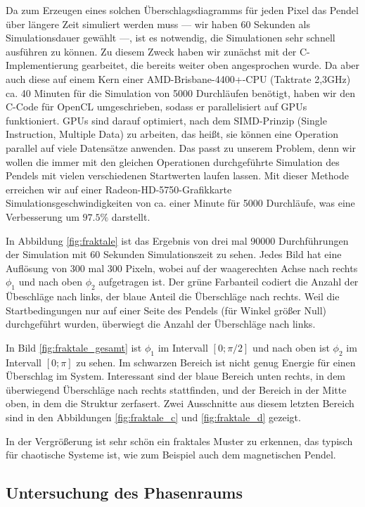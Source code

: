 Da zum Erzeugen eines solchen Überschlagsdiagramms für jeden Pixel das Pendel über längere Zeit simuliert werden muss --- wir haben 60 Sekunden
als Simulationsdauer gewählt ---, ist es notwendig, die Simulationen sehr schnell ausführen zu können. Zu diesem Zweck haben wir zunächst mit der
C-Implementierung gearbeitet, die bereits weiter oben angesprochen wurde. Da aber auch diese auf einem Kern einer AMD-Brisbane-4400+-CPU
(Taktrate 2,3GHz) ca. 40 Minuten für die Simulation von 5000 Durchläufen benötigt, haben wir den C-Code für OpenCL umgeschrieben, sodass er
parallelisiert auf GPUs funktioniert. GPUs sind darauf optimiert, nach dem SIMD-Prinzip (Single Instruction, Multiple Data) zu arbeiten, das heißt, sie
können eine Operation parallel auf viele Datensätze anwenden\citep{gpuwiki}. Das passt zu unserem Problem, denn wir wollen die immer mit den gleichen
Operationen durchgeführte Simulation des Pendels mit vielen verschiedenen Startwerten laufen lassen. Mit dieser Methode erreichen wir auf einer
Radeon-HD-5750-Grafikkarte Simulationsgeschwindigkeiten von ca. einer Minute für 5000 Durchläufe, was eine
Verbesserung um $97.5\%$ darstellt.

In Abbildung \ref{fig:fraktale} ist das Ergebnis von drei mal 90000 Durchführungen der Simulation mit 60 Sekunden Simulationszeit zu sehen.
Jedes Bild hat eine Auflösung von 300 mal 300 Pixeln, wobei auf der waagerechten Achse nach rechts $\phi_1$ und nach oben $\phi_2$ aufgetragen ist.
Der grüne Farbanteil codiert die Anzahl der Übeschläge nach links, der blaue Anteil die Überschläge nach rechts.
Weil die Startbedingungen nur auf einer Seite des Pendels (für Winkel größer Null) durchgeführt wurden, überwiegt die Anzahl der Überschläge nach links.

In Bild \ref{fig:fraktale_gesamt} ist $\phi_1$ im Intervall $[0; \pi/2]$ und nach oben ist $\phi_2$ im Intervall $[0; \pi]$ zu sehen.
Im schwarzen Bereich ist nicht genug Energie für einen Überschlag im System.
Interessant sind der blaue Bereich unten rechts, in dem überwiegend Überschläge nach rechts stattfinden, und der Bereich in der Mitte oben, in dem die Struktur zerfasert.
Zwei Ausschnitte aus diesem letzten Bereich sind in den Abbildungen \ref{fig:fraktale_c} und \ref{fig:fraktale_d} gezeigt.

In der Vergrößerung ist sehr schön ein fraktales Muster zu erkennen, das typisch für chaotische Systeme ist, wie zum Beispiel auch dem magnetischen Pendel. \citep{wikimagnetisch}

\subsection{Untersuchung des Phasenraums}

